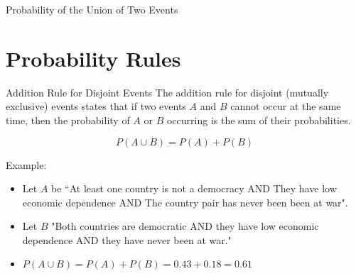 \documentclass[handout]{beamer} %
\begin{document}
\begin{frame}{Probability of the Union of Two Events}

\centering

\end{frame}



\section{Probability Rules}


\begin{frame}{Addition Rule for Disjoint Events}
    The addition rule for disjoint (mutually exclusive) events states that if two events \( A \) and \( B \) cannot occur at the same time, then the probability of \( A \) or \( B \) occurring is the sum of their probabilities.\pause

    \[ P(A \cup B) = P(A) + P(B) \]\pause

    Example:\pause
    \begin{itemize}
        \item Let $A$ be ``At least one country is not a democracy AND They have low economic dependence AND The country pair has never been been at war".\pause
        \item Let $B$ "Both countries are democratic AND they have low economic dependence AND they have never been at war."\pause
        \item $P(A \cup B) = P(A) + P(B) = 0.43 + 0.18 = 0.61$
    \end{itemize}

\end{frame}
\end{document}
